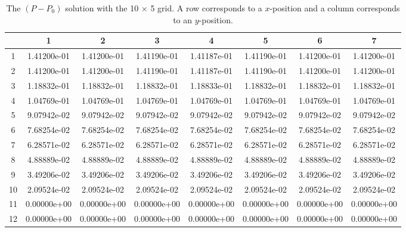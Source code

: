 \documentclass{article}
\begin{document}
\def\arraystretch{1.3}
\begin{table}[H]
	\scriptsize
	\centering
	\caption{The $(P - P_0)$ solution with the 10 $\times$ 5 grid. A row corresponds to a $x$-position and a column corresponds to an $y$-position.}
	\vspace{0.2cm}
	\begin{tabular}{c|S|S|S|S|S|S|S}
		& {1} & {2} & {3} & {4} & {5} & {6} & {7} \\
		 & 1.41200e-01 & 1.41200e-01 & 1.41190e-01 & 1.41187e-01 & 1.41190e-01 & 1.41200e-01 & 1.41200e-01 \\
		2 & 1.41200e-01 & 1.41200e-01 & 1.41190e-01 & 1.41187e-01 & 1.41190e-01 & 1.41200e-01 & 1.41200e-01 \\
		3 & 1.18832e-01 & 1.18832e-01 & 1.18832e-01 & 1.18833e-01 & 1.18832e-01 & 1.18832e-01 & 1.18832e-01 \\
		4 & 1.04769e-01 & 1.04769e-01 & 1.04769e-01 & 1.04769e-01 & 1.04769e-01 & 1.04769e-01 & 1.04769e-01 \\
		5 & 9.07942e-02 & 9.07942e-02 & 9.07942e-02 & 9.07942e-02 & 9.07942e-02 & 9.07942e-02 & 9.07942e-02 \\
		6 & 7.68254e-02 & 7.68254e-02 & 7.68254e-02 & 7.68254e-02 & 7.68254e-02 & 7.68254e-02 & 7.68254e-02 \\
		7 & 6.28571e-02 & 6.28571e-02 & 6.28571e-02 & 6.28571e-02 & 6.28571e-02 & 6.28571e-02 & 6.28571e-02 \\
		8 & 4.88889e-02 & 4.88889e-02 & 4.88889e-02 & 4.88889e-02 & 4.88889e-02 & 4.88889e-02 & 4.88889e-02 \\
		9 & 3.49206e-02 & 3.49206e-02 & 3.49206e-02 & 3.49206e-02 & 3.49206e-02 & 3.49206e-02 & 3.49206e-02 \\
		10 & 2.09524e-02 & 2.09524e-02 & 2.09524e-02 & 2.09524e-02 & 2.09524e-02 & 2.09524e-02 & 2.09524e-02 \\
		11 & 0.00000e+00 & 0.00000e+00 & 0.00000e+00 & 0.00000e+00 & 0.00000e+00 & 0.00000e+00 & 0.00000e+00 \\
		12 & 0.00000e+00 & 0.00000e+00 & 0.00000e+00 & 0.00000e+00 & 0.00000e+00 & 0.00000e+00 & 0.00000e+00 \\
	\end{tabular}
	\label{table:coarse-p-p0}
\end{table}
\end{document}
